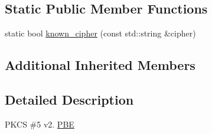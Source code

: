\subsection*{Static Public Member Functions}
\begin{DoxyCompactItemize}
\item 
static bool \hyperlink{classBotan_1_1PBE__PKCS5v20_a2085d49b166a6ef7b6523e4938e324db}{known\-\_\-cipher} (const std\-::string \&cipher)
\end{DoxyCompactItemize}
\subsection*{Additional Inherited Members}


\subsection{Detailed Description}
P\-K\-C\-S \#5 v2. \hyperlink{classBotan_1_1PBE}{P\-B\-E} 

